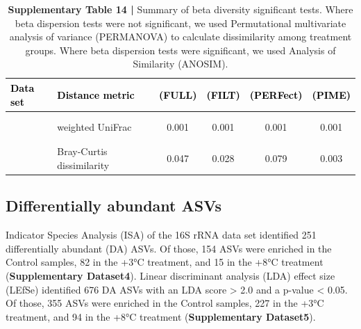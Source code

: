 \documentclass[
  10pt,
  letterpaper,
  DIV=11,
  numbers=noendperiod]{scrartcl}
\begin{document}
\begin{table}[H]

\caption{\textbf{Supplementary Table 14 |} Summary of beta diversity significant tests. Where beta dispersion tests were not significant, we used Permutational multivariate analysis of variance (PERMANOVA) to calculate dissimilarity among treatment groups. Where beta dispersion tests were significant, we used Analysis of Similarity (ANOSIM).}
\centering
\fontsize{9}{11}\selectfont
\begin{tabular}[t]{llcccc}
\toprule
\textcolor{black}{\textbf{Data set}} & \textcolor{black}{\textbf{Distance metric}} & \textcolor{black}{\textbf{(FULL)}} & \textcolor{black}{\textbf{(FILT)}} & \textcolor{black}{\textbf{(PERFect)}} & \textcolor{black}{\textbf{(PIME)}}\\
\midrule
\addlinespace[1em]
\multicolumn{6}{l}{\textbf{16S rRNA}}\\
\hspace{1em}\cellcolor{gray!6}{} & \cellcolor{gray!6}{unweighted UniFrac} & \cellcolor{gray!6}{0.003} & \cellcolor{gray!6}{0.003} & \cellcolor{gray!6}{0.003} & \cellcolor{gray!6}{0.001}\\
\hspace{1em} & weighted UniFrac & 0.001 & 0.001 & 0.001 & 0.001\\
\addlinespace[0.3em]
\multicolumn{6}{l}{\textbf{ITS}}\\
\hspace{1em}\cellcolor{gray!6}{} & \cellcolor{gray!6}{Jensen-Shannon divergence} & \cellcolor{gray!6}{0.036} & \cellcolor{gray!6}{0.030} & \cellcolor{gray!6}{0.063} & \cellcolor{gray!6}{0.002}\\
\hspace{1em} & Bray-Curtis dissimilarity & 0.047 & 0.028 & 0.079 & 0.003\\
\bottomrule
\end{tabular}
\end{table}

\hypertarget{differentially-abundant-asvs}{%
\subsection{Differentially abundant
ASVs}\label{differentially-abundant-asvs}}

Indicator Species Analysis (ISA) of the 16S rRNA data set identified 251
differentially abundant (DA) ASVs. Of those, 154 ASVs were enriched in
the Control samples, 82 in the +3°C treatment, and 15 in the +8°C
treatment (\textbf{Supplementary Dataset4}). Linear discriminant
analysis (LDA) effect size (LEfSe) identified 676 DA ASVs with an LDA
score \textgreater{} 2.0 and a p-value \textless{} 0.05. Of those, 355
ASVs were enriched in the Control samples, 227 in the +3°C treatment,
and 94 in the +8°C treatment (\textbf{Supplementary Dataset5}).
\end{document}
